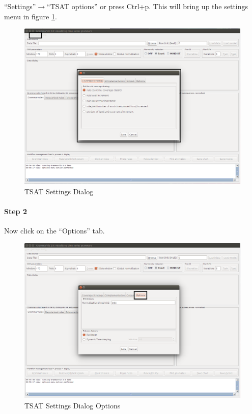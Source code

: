 \documentclass[letterpaper, 12pt]{article}
\begin{document}
``Settings''$\rightarrow$``TSAT options'' or press Ctrl+p. This will bring up the settings menu in figure \ref{fig:TSAT-settings-dialog}.

\begin{figure}[H]
  \includegraphics[width=\textwidth]{TSAT-settings-dialog}
  \caption{TSAT Settings Dialog}
  \label{fig:TSAT-settings-dialog}
\end{figure}

\newpage
\paragraph{Step 2}
Now click on the ``Options'' tab.

\begin{figure}[H]
  \includegraphics[width=\textwidth]{TSAT-settings-dialog-options}
  \caption{TSAT Settings Dialog Options}
  \label{fig:TSAT-settings-dialog-options}
\end{figure}
\end{document}
